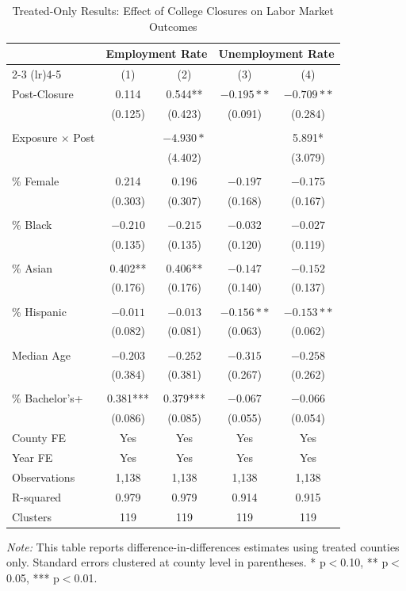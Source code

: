 \documentclass[12pt]{article}
\begin{document}
\begin{table}[H]
\centering
\caption{Treated-Only Results: Effect of College Closures on Labor Market Outcomes}
\label{tab:main}
\small
\begin{tabular}{lcccc}
\toprule
& \multicolumn{2}{c}{Employment Rate} & \multicolumn{2}{c}{Unemployment Rate} \\
\cmidrule(lr){2-3} \cmidrule(lr){4-5}
& (1) & (2) & (3) & (4) \\
\midrule
Post-Closure & 0.114 & 0.544** & $-0.195**$ & $-0.709**$ \\
& (0.125) & (0.423) & (0.091) & (0.284) \\
& & & & \\
Exposure $\times$ Post & & $-4.930*$ & & 5.891* \\
& & (4.402) & & (3.079) \\
& & & & \\
\% Female & 0.214 & 0.196 & $-0.197$ & $-0.175$ \\
& (0.303) & (0.307) & (0.168) & (0.167) \\
& & & & \\
\% Black & $-0.210$ & $-0.215$ & $-0.032$ & $-0.027$ \\
& (0.135) & (0.135) & (0.120) & (0.119) \\
& & & & \\
\% Asian & 0.402** & 0.406** & $-0.147$ & $-0.152$ \\
& (0.176) & (0.176) & (0.140) & (0.137) \\
& & & & \\
\% Hispanic & $-0.011$ & $-0.013$ & $-0.156**$ & $-0.153**$ \\
& (0.082) & (0.081) & (0.063) & (0.062) \\
& & & & \\
Median Age & $-0.203$ & $-0.252$ & $-0.315$ & $-0.258$ \\
& (0.384) & (0.381) & (0.267) & (0.262) \\
& & & & \\
\% Bachelor's+ & 0.381*** & 0.379*** & $-0.067$ & $-0.066$ \\
& (0.086) & (0.085) & (0.055) & (0.054) \\
\midrule
County FE & Yes & Yes & Yes & Yes \\
Year FE & Yes & Yes & Yes & Yes \\
Observations & 1,138 & 1,138 & 1,138 & 1,138 \\
R-squared & 0.979 & 0.979 & 0.914 & 0.915 \\
Clusters & 119 & 119 & 119 & 119 \\
\bottomrule
\end{tabular}
\captionsetup{justification=raggedright,singlelinecheck=false}
\vspace{0.2cm}
\textit{Note:} This table reports difference-in-differences estimates using treated counties only. Standard errors clustered at county level in parentheses. * p$<$0.10, ** p$<$0.05, *** p$<$0.01.
\end{table}
\end{document}
